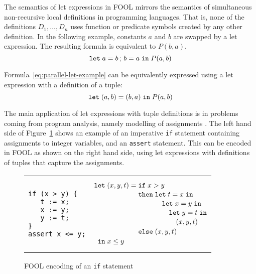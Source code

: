 \documentclass{easychair}
\begin{document}
The semantics of let expressions in FOOL mirrors the semantics of
simultaneous non-recursive local definitions in programming languages. 
That is, none of the definitions $D_1,\ldots,\allowbreak D_n$ uses function or
predicate symbols created by any other definition. 
In the following example, constants $a$ and $b$ are swapped by a let 
expression. 
The resulting formula is equivalent to $P(b, a)$.
\begin{equation}\label{eq:parallel-let-example}
\mathtt{let}\;{a}={b}\,;\,{b}={a}\;\mathtt{in}\;P(a, b)
\end{equation}

Formula~\ref{eq:parallel-let-example} can be equivalently expressed using 
a let expression with a definition of a tuple:
\begin{equation}\label{eq:parallel-let-tuple-example}
\mathtt{let}\;{(a,b)}={(b,a)}\;\mathtt{in}\;P(a, b)
\end{equation}

The main application of let expressions with tuple definitions is in 
problems coming from program analysis, namely modelling of assignments
\cite{KKV18}.
The left hand side of Figure~\ref{fig:simple-if} shows an example of an 
imperative \texttt{if} statement containing assignments to integer variables, 
and an \texttt{assert} statement. 
This can be encoded in FOOL as shown on the right hand side, using 
let expressions with definitions of tuples that capture the assignments.

\begin{figure}[htbp]
\begin{center}
\begin{tabular}[t]{ll}
\begin{minipage}{0.3\textwidth}
\begin{verbatim}
if (x > y) {
   t := x;
   x := y;
   y := t;
}
assert x <= y;
\end{verbatim}
\end{minipage}
&
\begin{minipage}{0.3\textwidth}
\[
  \letnl{(x,y,t)}{\itenll{x > y}
                 {\letinnl{t}{x}
                          {\letinnl{x}{y}
                                   {\letinnl{y}{t}
                                            {(x,y,t)}}}}
                 {(x,y,t)}}
        {x \le y}
\]
\end{minipage}
\\
\end{tabular}
\end{center}
\caption{FOOL encoding of an {\tt if} statement}
\label{fig:simple-if}
\end{figure}
\end{document}
